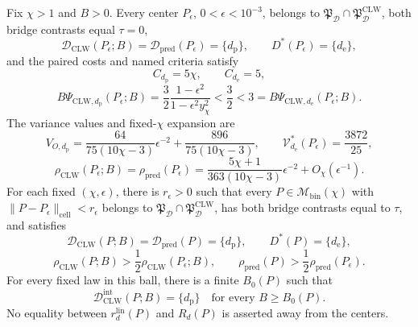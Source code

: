 Fix \(\chi>1\) and \(B>0\). Every center \(P_\epsilon\), \(0<\epsilon<10^{-3}\), belongs to \(\mathfrak P_{\mathcal D}\cap\mathfrak P_{\mathcal D}^{\mathrm{CLW}}\), both bridge contrasts equal \(\tau=0\),
\[
 \mathcal D_{\mathrm{CLW}}(P_\epsilon;B)
 =\mathcal D_{\mathrm{pred}}(P_\epsilon)=\{d_{\mathrm p}\},
 \qquad D^*(P_\epsilon)=\{d_{\mathrm e}\},               \tag{1}
\]
and the paired costs and named criteria satisfy
\[
 C_{d_{\mathrm p}}=5\chi,
 \qquad C_{d_{\mathrm e}}=5,
\]
\[
 B\Psi_{\mathrm{CLW},d_{\mathrm p}}(P_\epsilon;B)
 =\frac32\frac{1-\epsilon^2}{1-\epsilon^2y_\chi^2}
 <\frac32<3
 =B\Psi_{\mathrm{CLW},d_{\mathrm e}}(P_\epsilon;B).      \tag{2}
\]
The variance values and fixed-\(\chi\) expansion are
\[
 V_{O,d_{\mathrm p}}
 =\frac{64}{75(10\chi-3)}\epsilon^{-2}
 +\frac{896}{75(10\chi-3)},
 \qquad
 \mathcal V_{d_{\mathrm e}}^*(P_\epsilon)=\frac{3872}{25},
\]
\[
 \rho_{\mathrm{CLW}}(P_\epsilon;B)
 =\rho_{\mathrm{pred}}(P_\epsilon)
 =\frac{5\chi+1}{363(10\chi-3)}\epsilon^{-2}
 +O_\chi(\epsilon^{-1}).                                  \tag{3}
\]
For each fixed \((\chi,\epsilon)\), there is \(r_\epsilon>0\) such that every \(P\in\mathcal M_{\mathrm{bin}}(\chi)\) with \(\|P-P_\epsilon\|_{\mathrm{cell}}<r_\epsilon\) belongs to \(\mathfrak P_{\mathcal D}\cap\mathfrak P_{\mathcal D}^{\mathrm{CLW}}\), has both bridge contrasts equal to \(\tau\), and satisfies
\[
 \mathcal D_{\mathrm{CLW}}(P;B)
 =\mathcal D_{\mathrm{pred}}(P)=\{d_{\mathrm p}\},
 \qquad D^*(P)=\{d_{\mathrm e}\},                         \tag{4}
\]
\[
 \rho_{\mathrm{CLW}}(P;B)>\frac12\rho_{\mathrm{CLW}}(P_\epsilon;B),
 \qquad
 \rho_{\mathrm{pred}}(P)>\frac12\rho_{\mathrm{pred}}(P_\epsilon). \tag{5}
\]
For every fixed law in this ball, there is a finite \(B_0(P)\) such that
\[
 \mathcal D_{\mathrm{CLW}}^{\mathrm{int}}(P;B)=\{d_{\mathrm p}\}
 \quad\text{for every }B\ge B_0(P).                       \tag{6}
\]
No equality between \(r_d^{\mathrm{lin}}(P)\) and \(R_d(P)\) is asserted away from the centers.